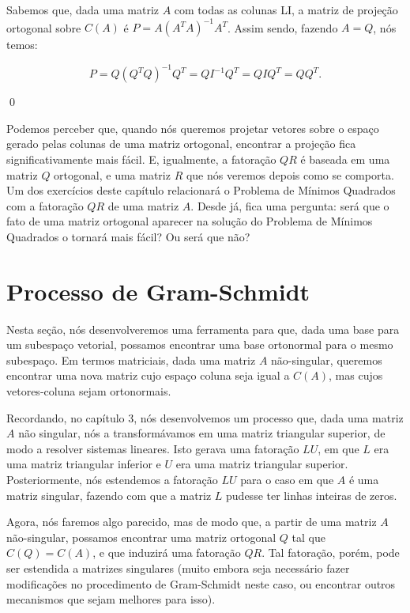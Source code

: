 \begin{Proof}
	Sabemos que, dada uma matriz $A$ com todas as colunas LI, a matriz de projeção ortogonal sobre $C(A)$ é $P = A(A^TA)^{-1}A^T$. Assim sendo, fazendo $A = Q$, nós temos:
	
	$$
	P = Q(Q^TQ)^{-1}Q^T = QI^{-1}Q^T = QIQ^T = QQ^T.
	$$
	
	\qed
\end{Proof}

Podemos perceber que, quando nós queremos projetar vetores sobre o espaço gerado pelas colunas de uma matriz ortogonal, encontrar a projeção fica significativamente mais fácil. E, igualmente, a fatoração $QR$ é baseada em uma matriz $Q$ ortogonal, e uma matriz $R$ que nós veremos depois como se comporta. Um dos exercícios deste capítulo relacionará o Problema de Mínimos Quadrados com a fatoração $QR$ de uma matriz $A$. Desde já, fica uma pergunta: será que o fato de uma matriz ortogonal aparecer na solução do Problema de Mínimos Quadrados o tornará mais fácil? Ou será que não?

\section{Processo de Gram-Schmidt}

Nesta seção, nós desenvolveremos uma ferramenta para que, dada uma base para um subespaço vetorial, possamos encontrar uma base ortonormal para o mesmo subespaço. Em termos matriciais, dada uma matriz $A$ não-singular, queremos encontrar uma nova matriz cujo espaço coluna seja igual a $C(A)$, mas cujos vetores-coluna sejam ortonormais.

Recordando, no capítulo $3$, nós desenvolvemos um processo que, dada uma matriz $A$ não singular, nós a transformávamos em uma matriz triangular superior, de modo a resolver sistemas lineares. Isto gerava uma fatoração $LU$, em que $L$ era uma matriz triangular inferior e $U$ era uma matriz triangular superior. Posteriormente, nós estendemos a fatoração $LU$ para o caso em que $A$ é uma matriz singular, fazendo com que a matriz $L$ pudesse ter linhas inteiras de zeros.

Agora, nós faremos algo parecido, mas de modo que, a partir de uma matriz $A$ não-singular, possamos encontrar uma matriz ortogonal $Q$ tal que $C(Q) = C(A)$, e que induzirá uma fatoração $QR$. Tal fatoração, porém, pode ser estendida a matrizes singulares (muito embora seja necessário fazer modificações no procedimento de Gram-Schmidt neste caso, ou encontrar outros mecanismos que sejam melhores para isso).


